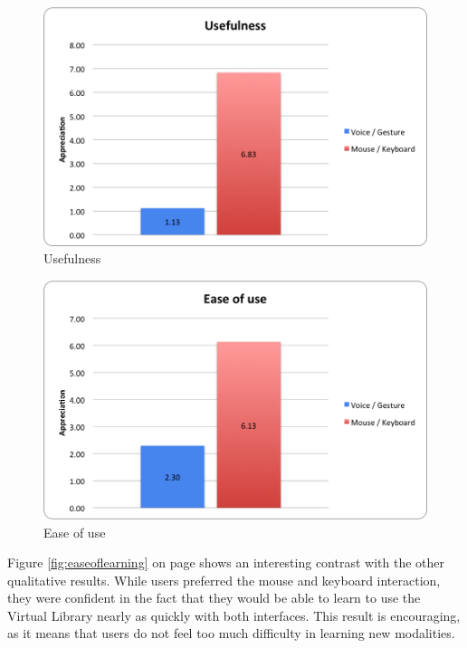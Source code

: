 \documentclass[a4paper, 10pt]{article}
\begin{document}
	\begin{figure}[h]
		\centering
			\includegraphics[scale=0.6]{graphs/usefulness.png}
		\caption{Usefulness}
		\label{fig:useful}
	\end{figure}
	
	\begin{figure}[h]
		\centering
			\includegraphics[scale=0.6]{graphs/ease_of_use.png}
		\caption{Ease of use}
		\label{fig:easeofuse}
	\end{figure}
	
	\par{Figure \ref{fig:easeoflearning} on page \pageref{fig:easeoflearning} shows an interesting contrast with the other qualitative results. While users preferred the mouse and keyboard interaction, they were confident in the fact that they would be able to learn to use the Virtual Library nearly as quickly with both interfaces. This result is encouraging, as it means that users do not feel too much difficulty in learning new modalities.}
	
\end{document}
